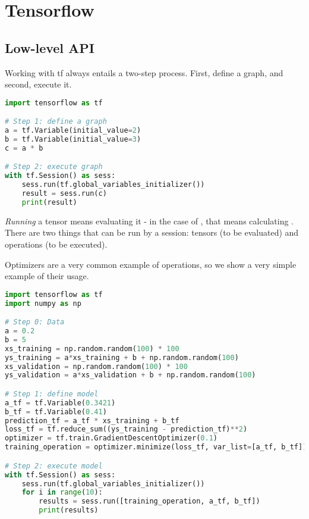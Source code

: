 \section{Tensorflow}

\subsection{Low-level API}

Working with tf always entails a two-step process. First, define a graph, and second, execute it. 

\begin{lstlisting}[language=python]
import tensorflow as tf

# Step 1: define a graph
a = tf.Variable(initial_value=2)
b = tf.Variable(initial_value=3)
c = a * b

# Step 2: execute graph
with tf.Session() as sess:
    sess.run(tf.global_variables_initializer())
    result = sess.run(c)
    print(result)

\end{lstlisting}

\emph{Running} a tensor means evaluating it - in the case of , that means calculating .
There are two things that can be run by a session: tensors (to be evaluated) and operations (to be executed). 

Optimizers are a very common example of operations, so we show a very simple example of their usage.

\begin{lstlisting}[language=python]
import tensorflow as tf
import numpy as np

# Step 0: Data
a = 0.2
b = 5
xs_training = np.random.random(100) * 100
ys_training = a*xs_training + b + np.random.random(100)
xs_validation = np.random.random(100) * 100
ys_validation = a*xs_validation + b + np.random.random(100)

# Step 1: define model
a_tf = tf.Variable(0.3421)
b_tf = tf.Variable(0.41)
prediction_tf = a_tf * xs_training + b_tf
loss_tf = tf.reduce_sum((ys_training - prediction_tf)**2)
optimizer = tf.train.GradientDescentOptimizer(0.1)
training_operation = optimizer.minimize(loss_tf, var_list=[a_tf, b_tf])

# Step 2: execute model
with tf.Session() as sess:
    sess.run(tf.global_variables_initializer())
    for i in range(10):
        results = sess.run([training_operation, a_tf, b_tf])
        print(results)


\end{lstlisting}